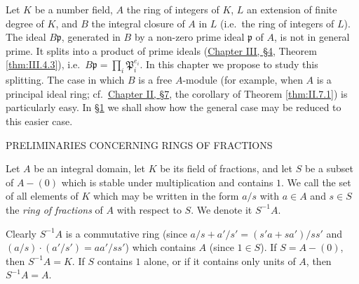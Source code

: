 \clearpage
{}%
\renewcommand{\chaptertitle}{THE SPLITTING OF PRIME IDEALS IN AN EXTENSION FIELD}

Let $K$ be a number field, $A$ the ring of integers of $K$, $L$ an extension
of finite degree of $K$, and $B$ the integral closure of $A$ in $L$ (i.e.\
the ring of integers of $L$). The ideal $B\mathfrak{p}$, generated in $B$ by
a non-zero prime ideal $\mathfrak{p}$ of $A$, is not in general prime. It
splits into a product of prime ideals (\hyperref[sec:3.4]{Chapter III, §4}, Theorem
\ref{thm:III.4.3}), i.e.\
$B\mathfrak{p}=\prod_{i}\mathfrak{P}_{i}^{e_{i}}$. In this chapter we propose
to study this splitting. The case in which $B$ is a free $A$-module (for
example, when $A$ is a principal ideal ring; cf.\ \hyperref[sec:2.7]{Chapter II, §7}, the
corollary of Theorem \ref{thm:II.7.1}) is particularly easy. In \hyperref[sec:5.1]{§1} we shall
show how the general case may be reduced to this easier case.

%
        {PRELIMINARIES CONCERNING RINGS OF FRACTIONS}

\begin{definition}
\label{def:V.1.1}
Let $A$ be an integral domain, let $K$ be its field of fractions, and let $S$
be a subset of $A-(0)$ which is stable under multiplication and contains $1$.
We call the set of all elements of $K$ which may be written in the form $a/s$
with $a\in A$ and $s\in S$ the \emph{ring of fractions} of $A$ with respect
to $S$. We denote it $S^{-1}A$.
\end{definition}

Clearly $S^{-1}A$ is a commutative ring (since
$a/s+a'/s'=(s'a+sa')/ss'$ and $(a/s)\cdot(a'/s')=aa'/ss'$) which contains
$A$ (since $1\in S$). If $S=A-(0)$, then $S^{-1}A=K$. If $S$ contains $1$
alone, or if it contains only units of $A$, then $S^{-1}A=A$.

